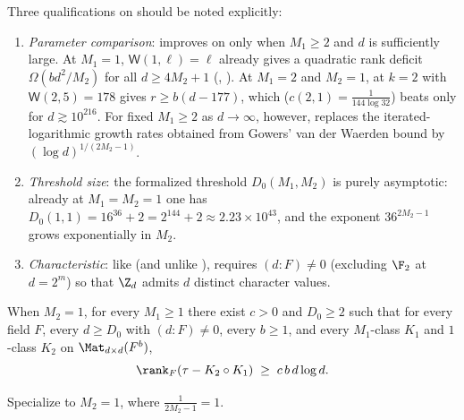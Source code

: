 \begin{remark}\label{rem:2b-threshold}
Three qualifications on  should be noted explicitly:
\begin{enumerate}[label=(\alph*)]
\item \emph{Parameter comparison}:  improves on \cite[Theorem~6.6]{SharedDecoders2026}
  only when $M_1 \ge 2$ and $d$ is sufficiently large. At $M_1 = 1$, $\mathsf{W}(1, \ell) = \ell$
  already gives a quadratic rank deficit $\Omega(bd^2 / M_2)$ for all $d \ge 4M_2 + 1$
  (\cite[Theorem~6.6]{SharedDecoders2026}, ).
  At $M_1 = 2$ and $M_2 = 1$, \cite[Theorem~6.6]{SharedDecoders2026} at $k = 2$ with
  $\mathsf{W}(2, 5) = 178$ \cite{StevensShantaram1978} gives $r \ge b(d - 177)$, which 
  ($c(2,1) = \frac{1}{144\log 32}$) beats only for $d \gtrsim 10^{216}$. For fixed $M_1 \ge 2$ as
  $d \to \infty$, however,  replaces the iterated-logarithmic growth rates obtained from
  Gowers' van der Waerden bound \cite{Gowers2001} by $(\log d)^{1/(2M_2 - 1)}$.
\item \emph{Threshold size}: the formalized threshold $D_0(M_1, M_2)$ is purely asymptotic: already
  at $M_1 = M_2 = 1$ one has $D_0(1,1) = 16^{36} + 2 = 2^{144} + 2 \approx 2.23 \times 10^{43}$, and
  the exponent $36^{2M_2 - 1}$ grows exponentially in $M_2$.
\item \emph{Characteristic}: like \cite[Theorem~6.6]{SharedDecoders2026} (and unlike ),
   requires $(d : F) \ne 0$ (excluding $\F_2$ at $d = 2^m$) so that $\Z_d$ admits $d$
  distinct character values.
\end{enumerate}
\end{remark}

\begin{corollary}\label{cor:2b-m2-one}
When $M_2 = 1$, for every $M_1 \ge 1$ there exist $c > 0$ and $D_0 \ge 2$ such that for every field
$F$, every $d \ge D_0$ with $(d : F) \ne 0$, every $b \ge 1$, and every $M_1$-class $K_1$ and
$1$-class $K_2$ on $\Mat_{d\times d}(F^b)$,
\[
  \rank_F(\tau - K_2 \circ K_1) \;\ge\; c\,b\,d\log d.
\]
\end{corollary}
\begin{outline}
Specialize  to $M_2 = 1$, where $\frac{1}{2M_2 - 1} = 1$.
\end{outline}

